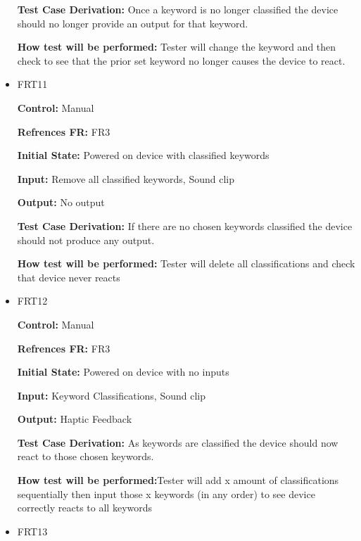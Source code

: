 \documentclass[12pt, titlepage]{article}
\begin{document}
\begin{itemize}
\textbf{Test Case Derivation:} Once a keyword is no longer classified the device should no longer provide an output for that keyword.
					
\textbf{How test will be performed:} Tester will change the keyword and then check to see that the prior set keyword no longer causes the device to react.


\item{FRT11}

\textbf{Control:} Manual 

\textbf{Refrences FR:} FR3 					

\textbf{Initial State:} Powered on device with classified keywords
					
\textbf{Input:} Remove all classified keywords, Sound clip
					
\textbf{Output:} No output

\textbf{Test Case Derivation:} If there are no chosen keywords classified the device should not produce any output.
					
\textbf{How test will be performed:} Tester will delete all classifications and check that device never reacts


\item{FRT12}

\textbf{Control:} Manual

\textbf{Refrences FR:} FR3 					

\textbf{Initial State:} Powered on device with no inputs
					
\textbf{Input:} Keyword Classifications, Sound clip
					
\textbf{Output:} Haptic Feedback

\textbf{Test Case Derivation:} As keywords are classified the device should now react to those chosen keywords.
					
\textbf{How test will be performed:}Tester will add x amount of classifications sequentially then input those x keywords (in any order) to see device correctly reacts to all keywords


\item{FRT13}


\end{itemize}
\end{document}
